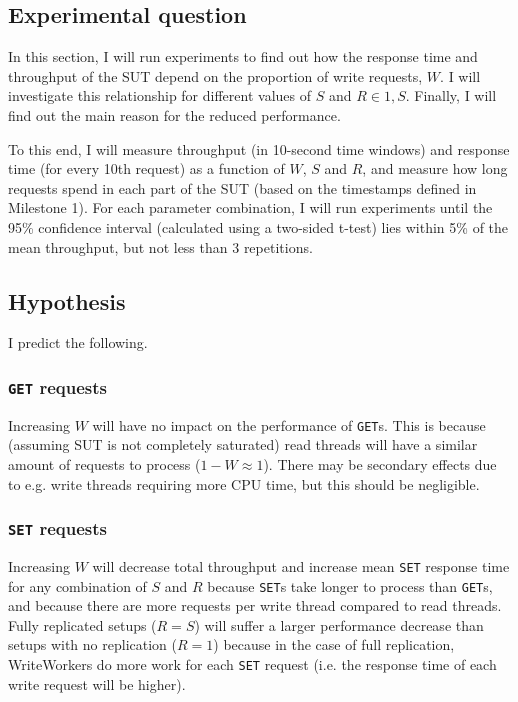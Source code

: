 \documentclass[11pt]{article}
\newcommand{\get}[0]{\texttt{GET}}
\newcommand{\set}[0]{\texttt{SET}}
\begin{document}
\subsection{Experimental question}

In this section, I will run experiments to find out how the response time and throughput of the SUT depend on the proportion of write requests, $W$. I will investigate this relationship for different values of $S$ and $R \in {1, S}$. Finally, I will find out the main reason for the reduced performance.

To this end, I will measure throughput (in 10-second time windows) and response time (for every 10th request) as a function of $W$, $S$ and $R$, and measure how long requests spend in each part of the SUT (based on the timestamps defined in Milestone 1). For each parameter combination, I will run experiments until the 95\% confidence interval (calculated using a two-sided t-test) lies within 5\% of the mean throughput, but not less than 3 repetitions.

\subsection{Hypothesis}

I predict the following.

\subsubsection{\get{} requests}
Increasing $W$ will have no impact on the performance of \get{}s. This is because (assuming SUT is not completely saturated) read threads will have a similar amount of requests to process ($1-W \approx 1$). There may be secondary effects due to e.g. write threads requiring more CPU time, but this should be negligible.

\subsubsection{\set{} requests}
Increasing $W$ will decrease total throughput and increase mean \set{} response time for any combination of $S$ and $R$ because \set{}s take longer to process than \get{}s, and because there are more requests per write thread compared to read threads. Fully replicated setups ($R=S$) will suffer a larger performance decrease than setups with no replication ($R=1$) because in the case of full replication, WriteWorkers do more work for each \set{} request (i.e. the response time of each write request will be higher).
\end{document}
